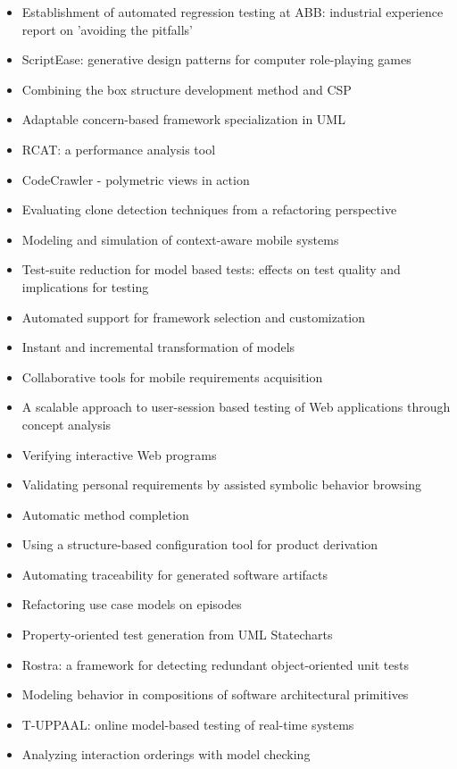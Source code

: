 {\small
\begin{itemize}[itemsep=-1ex]
  \item Establishment of automated regression testing at ABB: industrial experience report on 'avoiding the pitfalls'
  \item ScriptEase: generative design patterns for computer role-playing games
  \item Combining the box structure development method and CSP
  \item Adaptable concern-based framework specialization in UML
  \item RCAT: a performance analysis tool
  \item CodeCrawler - polymetric views in action
  \item Evaluating clone detection techniques from a refactoring perspective
  \item Modeling and simulation of context-aware mobile systems
  \item Test-suite reduction for model based tests: effects on test quality and implications for testing
  \item Automated support for framework selection and customization
  \item Instant and incremental transformation of models
  \item Collaborative tools for mobile requirements acquisition
  \item A scalable approach to user-session based testing of Web applications through concept analysis
  \item Verifying interactive Web programs
  \item Validating personal requirements by assisted symbolic behavior browsing
  \item Automatic method completion
  \item Using a structure-based configuration tool for product derivation
  \item Automating traceability for generated software artifacts
  \item Refactoring use case models on episodes
  \item Property-oriented test generation from UML Statecharts
  \item Rostra: a framework for detecting redundant object-oriented unit tests
  \item Modeling behavior in compositions of software architectural primitives
  \item T-UPPAAL: online model-based testing of real-time systems
  \item Analyzing interaction orderings with model checking

\end{itemize}}
